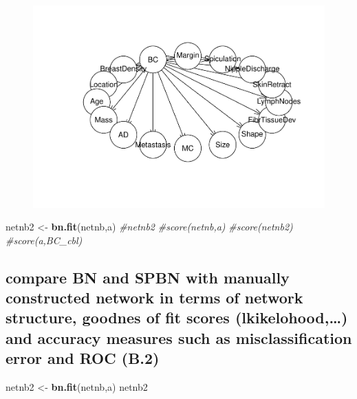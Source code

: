 \documentclass[]{article}
\newenvironment{Shaded}{\begin{snugshade}}{\end{snugshade}}
\newcommand{\KeywordTok}[1]{\textcolor[rgb]{0.13,0.29,0.53}{\textbf{{#1}}}}
\newcommand{\StringTok}[1]{\textcolor[rgb]{0.31,0.60,0.02}{{#1}}}
\newcommand{\CommentTok}[1]{\textcolor[rgb]{0.56,0.35,0.01}{\textit{{#1}}}}
\newcommand{\NormalTok}[1]{{#1}}
\begin{document}
\begin{figure}[htbp]
\centering
\includegraphics{BN_Ass2_files/figure-latex/unnamed-chunk-7-1.pdf}
\end{figure}

\begin{Shaded}
\begin{Highlighting}[]
\NormalTok{netnb2 <-}\StringTok{ }\KeywordTok{bn.fit}\NormalTok{(netnb,a)}
\CommentTok{#netnb2}
\CommentTok{#score(netnb,a)}
\CommentTok{#score(netnb2)}
\CommentTok{#score(a,BC_cbl)}
\end{Highlighting}
\end{Shaded}

\subsection{compare BN and SPBN with manually constructed network in
terms of network structure, goodnes of fit scores (lkikelohood,\ldots{})
and accuracy measures such as misclassification error and ROC
(B.2)}\label{compare-bn-and-spbn-with-manually-constructed-network-in-terms-of-network-structure-goodnes-of-fit-scores-lkikelohood-and-accuracy-measures-such-as-misclassification-error-and-roc-b.2}

\begin{Shaded}
\begin{Highlighting}[]
\NormalTok{netnb2 <-}\StringTok{ }\KeywordTok{bn.fit}\NormalTok{(netnb,a)}
\NormalTok{netnb2}
\end{Highlighting}
\end{Shaded}
\end{document}
